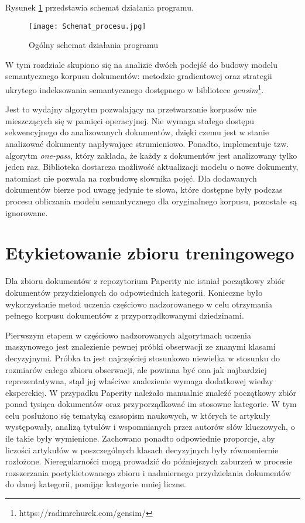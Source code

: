 \documentclass{pracamgr}
\begin{document}
Rysunek \ref{classification_approach} przedstawia schemat działania programu.

\begin{figure}[H]
    \centering
    \texttt{[image: Schemat\_procesu.jpg]}
    \caption{Ogólny schemat działania programu}
    \label{classification_approach}
\end{figure}

W tym rozdziale skupiono się na analizie dwóch podejść do budowy modelu semantycznego korpusu dokumentów: metodzie gradientowej oraz strategii ukrytego indeksowania semantycznego dostępnego w bibliotece \textit{gensim}\footnote{https://radimrehurek.com/gensim/}. 

Jest to wydajny algorytm pozwalający na przetwarzanie korpusów nie mieszczących się w pamięci operacyjnej. Nie wymaga stałego dostępu sekwencyjnego do analizowanych dokumentów, dzięki czemu jest w stanie analizować dokumenty napływające strumieniowo. Ponadto, implementuje tzw. algorytm \textit{one-pass}, który zakłada, że każdy z dokumentów jest analizowany tylko jeden raz. Biblioteka dostarcza możliwość aktualizacji modelu o nowe dokumenty, natomiast nie pozwala na rozbudowę słownika pojęć. Dla dodawanych dokumentów bierze pod uwagę jedynie te słowa, które dostępne były podczas procesu obliczania modelu semantycznego dla oryginalnego korpusu, pozostałe są ignorowane.

\section{Etykietowanie zbioru treningowego}
Dla zbioru dokumentów z repozytorium Paperity nie istniał początkowy zbiór dokumentów przydzielonych do odpowiednich kategorii. Konieczne było wykorzystanie metod uczenia częściowo nadzorowanego w celu otrzymania pełnego korpusu dokumentów z przyporządkowanymi dziedzinami.

Pierwszym etapem w częściowo nadzorowanych algorytmach uczenia maszynowego jest znalezienie pewnej próbki obserwacji ze znanymi klasami decyzyjnymi. Próbka ta jest najczęściej stosunkowo niewielka w stosunku do rozmiarów całego zbioru obserwacji, ale powinna być ona jak najbardziej reprezentatywna, stąd jej właściwe znalezienie wymaga dodatkowej wiedzy eksperckiej. W przypadku Paperity należało manualnie znaleźć początkowy zbiór ponad tysiąca dokumentów oraz przyporządkować im stosowne kategorie. W tym celu posłużono się tematyką czasopism naukowych, w których te artykuły występowały, analizą tytułów i wspomnianych przez autorów słów kluczowych, o ile takie były wymienione. Zachowano ponadto odpowiednie proporcje, aby liczości artykułów w poszczególnych klasach decyzyjnych były równomiernie rozłożone. Nieregularności mogą prowadzić do późniejszych zaburzeń w procesie rozszerzania poetykietowanego zbioru i nadmiernego przydzielania dokumentów do danej kategorii, pomijąc kategorie mniej liczne.
\end{document}
